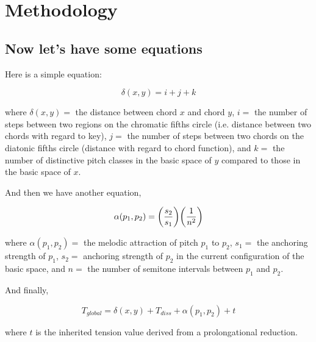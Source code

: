 % 


\section{Methodology}
\label{methodology}


\subsection{Now let's have some equations}

Here is a simple equation:

\begin{equation}
\delta(x,y) = i + j + k 
\end{equation}

\noindent where $\delta(x,y) =$ the distance between chord $x$ and chord $y$,  $i =$ the number of steps between two regions on the chromatic fifths circle (i.e. distance between two chords with regard to key), $j =$ the number of steps between two chords on the diatonic fifths circle (distance with regard to chord function), and $k =$ the number of distinctive pitch classes in the basic space of $y$ compared to those in the basic space of $x$. 


And then we have another equation,

\begin{equation}
\alpha(p_1,p_2) = \bigg{(}\frac{s_2}{s_1}\bigg{)}\bigg{(}\frac{1}{n^2}\bigg{)}
\end{equation}

\noindent where $\alpha(p_1,p_2) =$ the melodic attraction of pitch $p_1$ to $p_2$, $s_1 =$ the anchoring strength of $p_1$, $s_2 =$ anchoring strength of $p_2$ in the current configuration of the basic space, and $n =$ the number of semitone intervals between $p_1$ and $p_2$.


And finally, 

\begin{equation}
T_{global} = \delta(x,y) + T_{diss} + \alpha(p_1,p_2) + t
\end{equation}



\noindent where $t$ is the inherited tension value derived from a prolongational reduction.



